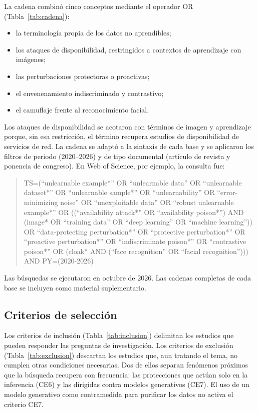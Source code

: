 La cadena combinó cinco conceptos mediante el operador OR (Tabla~\ref{tab:cadena}):
\begin{itemize}
\item la terminología propia de los datos no aprendibles;
\item los ataques de disponibilidad, restringidos a contextos de aprendizaje con imágenes;
\item las perturbaciones protectoras o proactivas;
\item el envenenamiento indiscriminado y contrastivo;
\item el camuflaje frente al reconocimiento facial.
\end{itemize}
Los ataques de disponibilidad se acotaron con términos de imagen y aprendizaje porque, sin esa restricción, el término recupera estudios de disponibilidad de servicios de red. La cadena se adaptó a la sintaxis de cada base y se aplicaron los filtros de periodo (2020--2026) y de tipo documental (artículo de revista y ponencia de congreso). En Web of Science, por ejemplo, la consulta fue:

\begin{quote}
\footnotesize
TS=(``unlearnable example*'' OR ``unlearnable data'' OR ``unlearnable dataset*'' OR ``unlearnable sample*'' OR ``unlearnability'' OR ``error-minimizing noise'' OR ``unexploitable data'' OR ``robust unlearnable example*'' OR ((``availability attack*'' OR ``availability poison*'') AND (image* OR ``training data'' OR ``deep learning'' OR ``machine learning'')) OR ``data-protecting perturbation*'' OR ``protective perturbation*'' OR ``proactive perturbation*'' OR ``indiscriminate poison*'' OR ``contrastive poison*'' OR (cloak* AND (``face recognition'' OR ``facial recognition''))) AND PY=(2020-2026)
\end{quote}

Las búsquedas se ejecutaron en octubre de 2026. Las cadenas completas de cada base se incluyen como material suplementario.



\subsection{Criterios de selección}

Los criterios de inclusión (Tabla~\ref{tab:inclusion}) delimitan los estudios que pueden responder las preguntas de investigación. Los criterios de exclusión (Tabla~\ref{tab:exclusion}) descartan los estudios que, aun tratando el tema, no cumplen otras condiciones necesarias. Dos de ellos separan fenómenos próximos que la búsqueda recupera con frecuencia: las protecciones que actúan solo en la inferencia (CE6) y las dirigidas contra modelos generativos (CE7). El uso de un modelo generativo como contramedida para purificar los datos no activa el criterio CE7.

